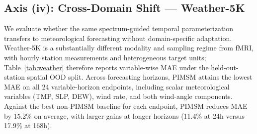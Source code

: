 \documentclass{article}
\begin{document}
\subsection{Axis (iv): Cross-Domain Shift — Weather-5K}
\label{sec:results:weather}

We evaluate whether the same spectrum-guided temporal parameterization transfers to meteorological forecasting without domain-specific adaptation.
Weather-5K is a substantially different modality and sampling regime from fMRI, with hourly station measurements and heterogeneous target units; Table~\ref{tab:weather} therefore reports variable-wise MAE under the held-out-station spatial OOD split.
Across forecasting horizons, PIMSM attains the lowest MAE on all 24 variable-horizon endpoints, including scalar meteorological variables (TMP, SLP, DEW), wind rate, and both wind-angle components.
Against the best non-PIMSM baseline for each endpoint, PIMSM reduces MAE by 15.2\% on average, with larger gains at longer horizons (11.4\% at 24h versus 17.9\% at 168h).
\end{document}
